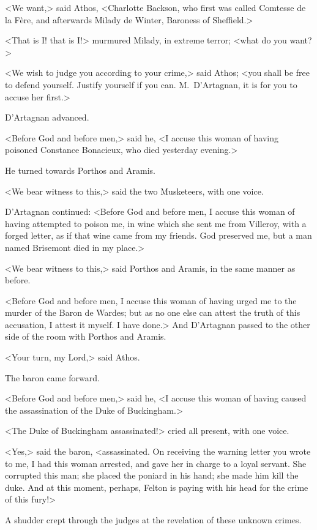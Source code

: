 <We want,> said Athos, <Charlotte Backson, who first was called Comtesse de la Fère, and afterwards Milady de Winter, Baroness of Sheffield.> 

<That is I! that is I!> murmured Milady, in extreme terror; <what do you want?> 

<We wish to judge you according to your crime,> said Athos; <you shall be free to defend yourself. Justify yourself if you can. M.~D'Artagnan, it is for you to accuse her first.> 

D'Artagnan advanced. 

<Before God and before men,> said he, <I accuse this woman of having poisoned Constance Bonacieux, who died yesterday evening.> 

He turned towards Porthos and Aramis. 

<We bear witness to this,> said the two Musketeers, with one voice. 

D'Artagnan continued: <Before God and before men, I accuse this woman of having attempted to poison me, in wine which she sent me from Villeroy, with a forged letter, as if that wine came from my friends. God preserved me, but a man named Brisemont died in my place.> 

<We bear witness to this,> said Porthos and Aramis, in the same manner as before. 

<Before God and before men, I accuse this woman of having urged me to the murder of the Baron de Wardes; but as no one else can attest the truth of this accusation, I attest it myself. I have done.> And D'Artagnan passed to the other side of the room with Porthos and Aramis. 

<Your turn, my Lord,> said Athos. 

The baron came forward. 

<Before God and before men,> said he, <I accuse this woman of having caused the assassination of the Duke of Buckingham.> 

<The Duke of Buckingham assassinated!> cried all present, with one voice. 

<Yes,> said the baron, <assassinated. On receiving the warning letter you wrote to me, I had this woman arrested, and gave her in charge to a loyal servant. She corrupted this man; she placed the poniard in his hand; she made him kill the duke. And at this moment, perhaps, Felton is paying with his head for the crime of this fury!> 

A shudder crept through the judges at the revelation of these unknown crimes. 

